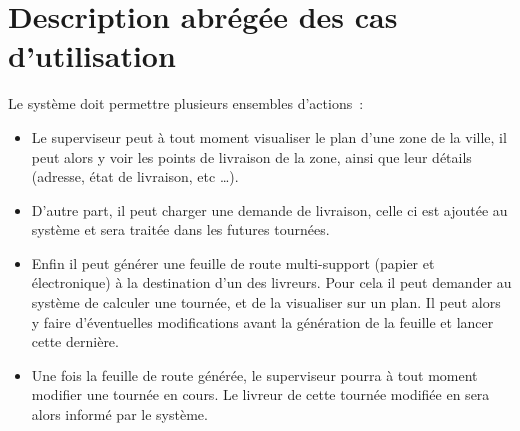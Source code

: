 \section{Description abr\'eg\'ee des cas d’utilisation}

Le système doit permettre plusieurs ensembles d’actions~:

\begin{itemize}
    \item Le superviseur peut à tout moment visualiser le plan d’une zone de la ville, il peut alors y voir les
    points de livraison de la zone, ainsi que leur détails (adresse, état de livraison, etc …).

    \item D’autre part, il peut charger une demande de livraison, celle ci est ajoutée au système et sera traitée
    dans les futures tournées.

    \item Enfin il peut générer une feuille de route multi-support (papier et électronique) à la destination d’un
    des livreurs. Pour cela il peut demander au système de calculer une tournée, et de la visualiser sur un plan.
    Il peut alors y faire d’éventuelles modifications avant la génération de la feuille et lancer cette dernière.

    \item Une fois la feuille de route générée, le superviseur pourra à tout moment modifier une tournée en cours.
    Le livreur de cette tournée modifiée en sera alors informé par le système.
\end{itemize}

